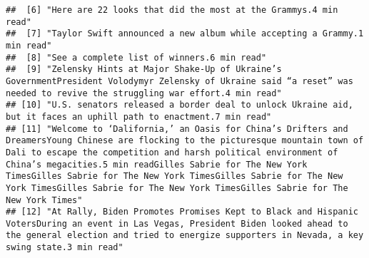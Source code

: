 \documentclass[
]{article}
\begin{document}
\begin{verbatim}
##  [6] "Here are 22 looks that did the most at the Grammys.4 min read"                                                                                                                                                                                                                                                                                                                                                        
##  [7] "Taylor Swift announced a new album while accepting a Grammy.1 min read"                                                                                                                                                                                                                                                                                                                                               
##  [8] "See a complete list of winners.6 min read"                                                                                                                                                                                                                                                                                                                                                                            
##  [9] "Zelensky Hints at Major Shake-Up of Ukraine’s GovernmentPresident Volodymyr Zelensky of Ukraine said “a reset” was needed to revive the struggling war effort.4 min read"                                                                                                                                                                                                                                             
## [10] "U.S. senators released a border deal to unlock Ukraine aid, but it faces an uphill path to enactment.7 min read"                                                                                                                                                                                                                                                                                                      
## [11] "Welcome to ‘Dalifornia,’ an Oasis for China’s Drifters and DreamersYoung Chinese are flocking to the picturesque mountain town of Dali to escape the competition and harsh political environment of China’s megacities.5 min readGilles Sabrie for The New York TimesGilles Sabrie for The New York TimesGilles Sabrie for The New York TimesGilles Sabrie for The New York TimesGilles Sabrie for The New York Times"
## [12] "At Rally, Biden Promotes Promises Kept to Black and Hispanic VotersDuring an event in Las Vegas, President Biden looked ahead to the general election and tried to energize supporters in Nevada, a key swing state.3 min read"                                                                                                                                                                                       

\end{verbatim}
\end{document}
